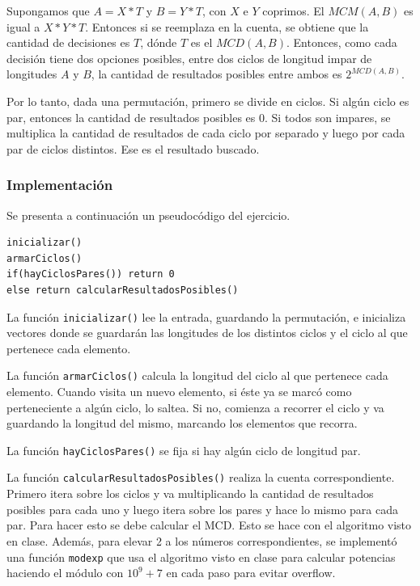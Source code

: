 Supongamos que $A=X*T$ y $B=Y*T$, con $X$ e $Y$ coprimos. El $MCM(A,B)$ es igual a $X*Y*T$. Entonces si se reemplaza en la cuenta, se obtiene que la cantidad de decisiones es $T$, dónde $T$ es el $MCD(A,B)$. Entonces, como cada decisión tiene dos opciones posibles, entre dos ciclos de longitud impar de longitudes $A$ y $B$, la cantidad de resultados posibles entre ambos es $2^{MCD(A,B)}$.

Por lo tanto, dada una permutación, primero se divide en ciclos. Si algún ciclo es par, entonces la cantidad de resultados posibles es 0. Si todos son impares, se multiplica la cantidad de resultados de cada ciclo por separado y luego por cada par de ciclos distintos. Ese es el resultado buscado.

\subsubsection{Implementación}

Se presenta a continuación un pseudocódigo del ejercicio.

\begin{verbatim}
inicializar()
armarCiclos()
if(hayCiclosPares()) return 0
else return calcularResultadosPosibles()
\end{verbatim}

La función \texttt{inicializar()} lee la entrada, guardando la permutación, e inicializa vectores donde se guardarán las longitudes de los distintos ciclos y el ciclo al que pertenece cada elemento.

La función \texttt{armarCiclos()} calcula la longitud del ciclo al que pertenece cada elemento. Cuando visita un nuevo elemento, si éste ya se marcó como perteneciente a algún ciclo, lo saltea. Si no, comienza a recorrer el ciclo y va guardando la longitud del mismo, marcando los elementos que recorra.

La función \texttt{hayCiclosPares()} se fija si hay algún ciclo de longitud par.

La función \texttt{calcularResultadosPosibles()} realiza la cuenta correspondiente. Primero itera sobre los ciclos y va multiplicando la cantidad de resultados posibles para cada uno y luego itera sobre los pares y hace lo mismo para cada par.
Para hacer esto se debe calcular el MCD. Esto se hace con el algoritmo visto en clase. Además, para elevar 2 a los números correspondientes, se implementó una función \texttt{modexp} que usa el algoritmo visto en clase para calcular potencias haciendo el módulo con $10^9 + 7$ en cada paso para evitar overflow.

